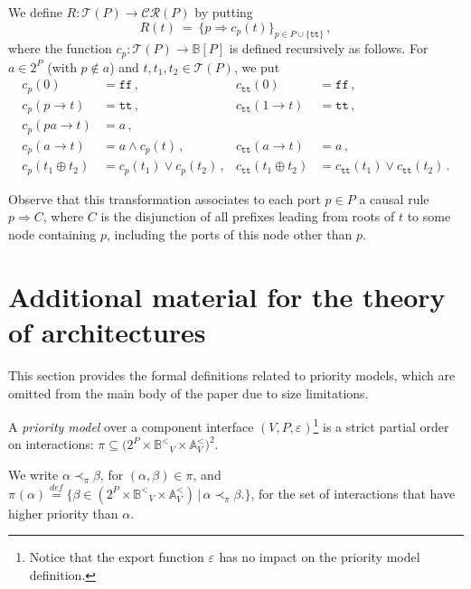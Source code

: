 \documentclass{llncs}
\newcommand{\sA}{\ensuremath{\mathbb{A}}}
\newcommand{\sB}{\ensuremath{\mathbb{B}}}
\newcommand{\bydef}[1]{\ensuremath{\stackrel{\mathit{\scriptscriptstyle def}}{#1}}}
\newcommand{\bsetdef}[2]{\ensuremath{\bigl\{{#1}\,\bigl|\,{#2}\bigr.\bigr\}}}
\newcommand{\true} {\ensuremath{\mathtt{t\!t}}}
\newcommand{\false}{\ensuremath{\mathtt{f\!f}}}
\newcommand{\order}{<}
\newcommand{\ordbool}{\ensuremath{\sB^{\order}}}
\newcommand{\guards}[1]{\ensuremath{\ordbool_{#1}}}
\newcommand{\updates}[1]{\ensuremath{\sA^{\order}_{#1}}}
\newcommand{\filter}[2][]{\ensuremath{\pi_{#1}({#2})}}
\newcommand{\export}[1][]{\ensuremath{\varepsilon_{#1}}}
\newcommand{\ct}{\ensuremath{\mathcal{T}}}
\newcommand{\cru}{\ensuremath{\mathcal{CR}}}
\begin{document}
We define $R: \ct(P) \rightarrow \cru(P)$ by putting
%
\begin{equation} 
  \label{eq:trees2rules}
  R(t)\ =\ \{p \Rightarrow c_p(t)\}_{p\in P\cup\{\true\}}\,,
\end{equation}
where the function $c_p : \ct(P) \rightarrow \sB[P]$ is defined recursively
as follows.  For $a\in 2^P$ (with $p\not\in a$) and $t,t_1,t_2 \in \ct(P)$,
we put
%
\begin{align*}
  c_p(0) & = \false\,, 
  & c_{\true}(0) & = \false\,,\\
  c_p(p \rightarrow t) & = \true\,,
  & c_{\true}(1 \rightarrow t) & = \true\,,\\
  c_p(pa \rightarrow t) & = a\,,\\
  c_p(a \rightarrow t) & = a \land c_p(t)\,,
  & c_{\true}(a \rightarrow t) & = a\,,\\
  c_p(t_1 \oplus t_2) & = c_p(t_1) \lor c_p(t_2)\,, 
  & c_{\true}(t_1 \oplus t_2) & = c_{\true}(t_1) \lor c_{\true}(t_2)\,.
\end{align*}

Observe that this transformation associates to each port $p \in P$ a
causal rule $p \Rightarrow C$, where $C$ is the disjunction of all
prefixes leading from roots of $t$ to some node containing $p$,
including the ports of this node other than $p$.

\section{Additional material for the theory of architectures}
\label{secn:arch:appendix}

This section provides the formal definitions related to priority
models, which are omitted from the main body of the paper due to size
limitations.

\begin{definition}
  \label{defn:priority}
  A \emph{priority model} over a component interface $(V, P,
  \export)$\footnote{%
%
    Notice that the export function $\export$ has no impact on the
    priority model definition.
%
  } is a strict partial order on interactions: $\pi
  \subseteq \bigl(2^P \times \guards{V} \times \updates{V} \bigr)^2$.

  We write $\alpha \prec_\pi \beta$, for $(\alpha, \beta) \in \pi$, and 
   $\filter{\alpha} \bydef{=} \bsetdef{\beta \in (2^P \times
    \guards{V} \times \updates{V})}{\alpha \prec_\pi \beta}$, for the set of
  interactions that have higher priority than $\alpha$.
\end{definition}
\end{document}
